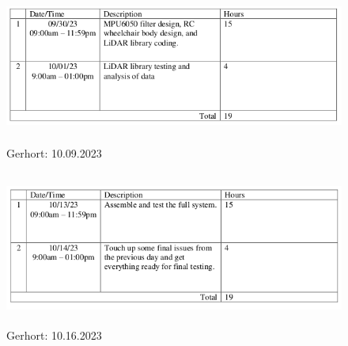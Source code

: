 \documentclass[conference]{IEEEtran}
\begin{document}
    \begin{figure}[htbp]
                \centerline{\includegraphics[height=2in,keepaspectratio]{figs/I/G_10.09.2023.png}}
                \caption{Gerhort: 10.09.2023}
                \label{Fig:G_10.09.2023}
    \end{figure} 
    \begin{figure}[htbp]
                \centerline{\includegraphics[height=2in,keepaspectratio]{figs/I/G_10.16.2023.png}}
                \caption{Gerhort: 10.16.2023}
                \label{Fig:G_10.16.2023}
    \end{figure} 
\end{document}
